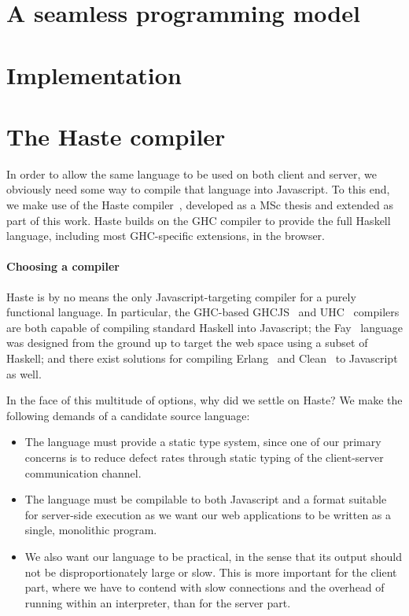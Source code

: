 \documentclass[preprint]{sigplanconf}
\begin{document}
\section{A seamless programming model}
\section{Implementation}
\section{The Haste compiler}

In order to allow the same language to be used on both client and server, we
obviously need some way to compile that language into Javascript. To this end,
we make use of the Haste compiler\ \cite{haste}, developed as a MSc thesis and
extended as part of this work. Haste builds on the GHC compiler to provide
the full Haskell language, including most GHC-specific extensions, in the
browser.

\paragraph{Choosing a compiler} Haste is by no means the only
Javascript-targeting compiler for a purely functional language. In particular,
the GHC-based GHCJS\ \cite{ghcjs} and UHC\ \cite{uhc} compilers are both
capable of compiling standard Haskell into Javascript; the Fay\ \cite{fay}
language was designed from the ground up to target the web space using a subset
of Haskell; and there exist solutions for compiling Erlang\ \cite{jserlang} and
Clean\ \cite{jsclean} to Javascript as well.

In the face of this multitude of options, why did we settle on Haste? We make
the following demands of a candidate source language:

\begin{itemize}
  \item The language must provide a static type system, since one of our
        primary concerns is to reduce defect rates through static typing of
        the client-server communication channel.
  \item The language must be compilable to both Javascript and a format
        suitable for server-side execution as we want our web applications
        to be written as a single, monolithic program.
  \item We also want our language to be practical, in the sense that its output
        should not be disproportionately large or slow. This is more important
        for the client part, where we have to contend with slow connections and
        the overhead of running within an interpreter, than for the server part.
\end{itemize}
\end{document}
